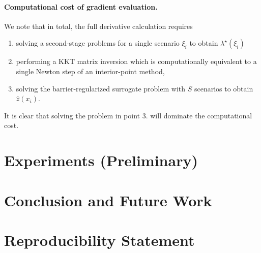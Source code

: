 \documentclass{article}
\begin{document}
\paragraph{Computational cost of gradient evaluation.}
We note that in total, the full derivative calculation requires 
\begin{enumerate}
    \item solving a second-stage problems for a single scenario $\xi_i$ to obtain $\lambda^\star(\xi_i)$
    \item performing a KKT matrix inversion which is computationally equivalent to a single Newton step of an interior-point method,
    \item solving the barrier-regularized surrogate problem with $S$ scenarios to obtain $\hat z(x_i)$.
\end{enumerate}
It is clear that solving the problem in point 3. will dominate the computational cost.

\section{Experiments (Preliminary)}


\section{Conclusion and Future Work}



\section*{Reproducibility Statement}
\end{document}
